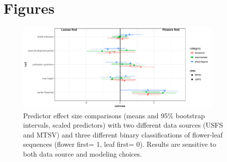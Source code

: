 \documentclass[12pt]{article}\usepackage[]{graphicx}\usepackage[]{color}
\begin{document}

\pagebreak
\section*{Figures}
\begin{figure}[here]
\includegraphics[width=0.9\textwidth]{..//figures/MTSV_v_USFS_comp.pdf}
\caption{Predictor effect size comparisons (means and 95\% bootstrap intervals, scaled predictors) with two different data sources (USFS and MTSV) and three different binary classifications of flower-leaf sequences (flower first= 1, leaf first= 0). Results are sensitive to both data source and modeling choices.}
\label{fig:Figure 1}
\end{figure}
\end{document}
